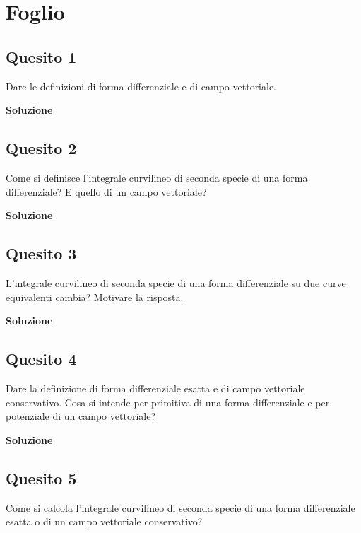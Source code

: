 \chapter{Foglio \ \thechapter}


\section*{Quesito 1}
Dare le definizioni di forma differenziale e di campo vettoriale.

\medskip
\begin{large}
\textbf{Soluzione}
\end{large}


\section*{Quesito 2}
Come si definisce l’integrale curvilineo di seconda specie di una forma differenziale? E quello di un campo vettoriale?


\medskip
\begin{large}
\textbf{Soluzione}
\end{large}


\section*{Quesito 3}
L’integrale curvilineo di seconda specie di una forma differenziale su due curve
equivalenti cambia? Motivare la risposta.


\medskip
\begin{large}
\textbf{Soluzione}
\end{large}


\section*{Quesito 4}
Dare la definizione di forma differenziale esatta e di campo vettoriale conservativo. Cosa si intende per primitiva di una forma differenziale e per potenziale di un
campo vettoriale?

\medskip
\begin{large}
\textbf{Soluzione}
\end{large}


\section*{Quesito 5}
Come si calcola l’integrale curvilineo di seconda specie di una forma differenziale esatta o di un campo vettoriale conservativo?

